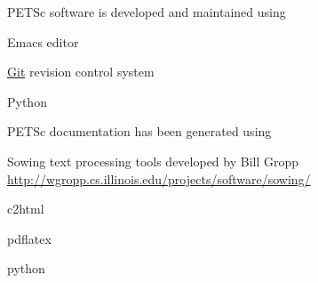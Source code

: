 PETSc software is developed and maintained using
\begin{tightitemize}
\item Emacs editor
\item \href{https://git-scm.com/}{Git} revision control system
\item Python
\end{tightitemize}

PETSc documentation has been generated using
\begin{tightitemize}
  \item Sowing text processing tools developed by Bill Gropp\\ \href{http://wgropp.cs.illinois.edu/projects/software/sowing/}{http://wgropp.cs.illinois.edu/projects/software/sowing/}
\item c2html
\item pdflatex
\item python
\end{tightitemize}
\
